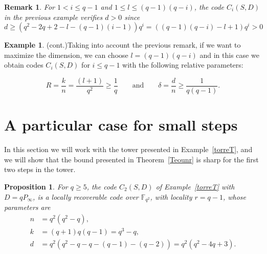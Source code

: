 \documentclass{amsart}
\newcommand\xrowht[2][0]{\addstackgap[.5\dimexpr#2\relax]{\vphantom{#1}}}
\newcommand{\F}{\mathbb{F}}
\newtheorem{pro}[thm]{Proposition}
\newtheorem{rem}[thm]{Remark}
\theoremstyle{definition}
\newtheorem{example}{Example}
\begin{document}
\begin{rem}
For $1 <i \leq q-1$ and $1 \leq l \leq (q-1)(q-i)$, the code $C_i(S,D)$ in the previous example verifies $d > 0$ since $$d \geq (q^2-2q+2-l-(q-1)(i-1))q^i = ((q-1)(q-i) - l+1)q^i > 0 $$ 
\end{rem}

\setcounter{example}{0}

\begin{example}(cont.)\label{torreTcont}
Taking into account the previous remark, if we want to maximize the dimension, we can choose $l=(q-1)(q-i)$ and in this case we obtain codes $C_{i}(S,D)$ for $i \leq q-1$ with the following relative parameters:

$$R=\frac{k}{n}= \frac{(l+1)}{q^2} \geq \frac{1}{q} \qquad \text{and} \qquad \delta =\frac{d}{n}\geq \frac{1}{q(q-1)}.$$


\end{example}

\section{A particular case for small steps}\label{sec4}

In this section we will work with the tower presented in Example~\ref{torreT}, and we will show that the bound presented in Theorem~\ref{Teounr} is sharp for the first two steps in the tower. 

\begin{pro}\label{exactmd}
	For $q\geq 5$, the code $C_2(S,D)$ of Example~\ref{torreT} with $D = qP_{\infty}$,
 is a locally recoverable code over $\F_{q^2}$, with locality $r=q-1$, whose parameters are \begin{align*}
	n&=q^2(q^2-q), \\
	k&= (q+1)q(q-1)=q^3-q, \\
	d&=q^2(q^2-q-q-(q-1)-(q-2)) = q^2(q^2-4q+3).\\
	\end{align*}
\end{pro}
\end{document}
